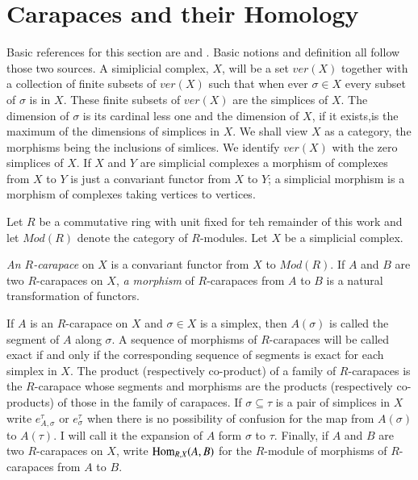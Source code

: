 \section{Carapaces and their Homology}\label{art6-sec-1}

Basic references for this section are \cite{art6-keyMac} and \cite{art6-keyGr}. Basic notions and definition all follow those two sources. A simiplicial complex, $X$, will be a set $ver(X)$ together with a collection of finite subsets of $ver(X)$ such that when ever $\sigma \in X$ every subset of $\sigma$ is in $X$. These finite subsets of $ver(X)$ are the simplices of $X$. The dimension of $\sigma $ is its cardinal less one and the dimension of $X$, if it exists,is the maximum of the dimensions of simplices in $X$. We shall view $X$ as a category, the morphisms being the inclusions of simlices. We identify $ver(X)$ with the zero simplices of $X$. If $X$ and $Y$ are simplicial complexes a morphism of complexes from $X$ to $Y$ is just a convariant functor from $X$ to $Y$; a simplicial morphism is a morphism of complexes taking vertices to vertices.

Let $R$ be a commutative ring with unit fixed for teh remainder of this work and let $M od(R)$ denote the category of $R$-modules. Let $X$ be a simplicial complex.

\begin{definition}\label{art6-def-1.1}
\textit{An $R$-carapace} on $X$ is a convariant functor from $X$ to $M od(R)$. If $A$ and $B$ are two $R$-carapaces on $X$, \textit{a morphism} of $R$-carapaces from $A$ to $B$ is a natural transformation of functors. 
\end{definition}
 If $A$ is an $R$-carapace on $X$ and $\sigma \in X$ is a simplex, then $A(\sigma)$ is called the segment of $A$ along $\sigma$. A sequence of morphisms of $R$-carapaces will be called exact if and only if the corresponding sequence of segments is exact for each simplex in $X$. The product (respectively co-product) of a family of $R$-carapaces is the $R$-carapace whose segments and morphisms are the products (respectively co-products) of those in  the family of carapaces. If $\sigma \subseteq \tau$ is a pair of simplices in $X$ write $e_{A, \sigma}^{\tau}$ or $e_{\sigma}^{\tau}$ when there is no possibility of confusion for the map from $A(\sigma)$ to $A(\tau)$. I will call it the expansion of $A$ form $\sigma$ to $\tau$. Finally, if $A$ and $B$ are two $R$-carapaces on $X$, write $\operatorname{Hom}_{R, X}(A, B)$ for the $R$-module of morphisms of $R$-carapaces from $A$ to $B$.

